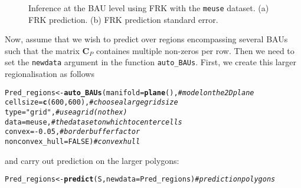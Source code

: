 \documentclass{article}\usepackage[]{graphicx}\usepackage[]{color}
\makeatletter
\newcommand{\hlnum}[1]{\textcolor[rgb]{0.686,0.059,0.569}{#1}}%
\newcommand{\hlstr}[1]{\textcolor[rgb]{0.192,0.494,0.8}{#1}}%
\newcommand{\hlcom}[1]{\textcolor[rgb]{0.678,0.584,0.686}{\textit{#1}}}%
\newcommand{\hlopt}[1]{\textcolor[rgb]{0,0,0}{#1}}%
\newcommand{\hlstd}[1]{\textcolor[rgb]{0.345,0.345,0.345}{#1}}%
\newcommand{\hlkwb}[1]{\textcolor[rgb]{0.69,0.353,0.396}{#1}}%
\newcommand{\hlkwc}[1]{\textcolor[rgb]{0.333,0.667,0.333}{#1}}%
\newcommand{\hlkwd}[1]{\textcolor[rgb]{0.737,0.353,0.396}{\textbf{#1}}}%
\newenvironment{kframe}{%
 \def\at@end@of@kframe{}%
 \ifinner\ifhmode%
  \def\at@end@of@kframe{\end{minipage}}%
  \begin{minipage}{\columnwidth}%
 \fi\fi%
 \def\FrameCommand##1{\hskip\@totalleftmargin \hskip-\fboxsep
 \colorbox{shadecolor}{##1}\hskip-\fboxsep
     \hskip-\linewidth \hskip-\@totalleftmargin \hskip\columnwidth}%
 \MakeFramed {\advance\hsize-\width
   \@totalleftmargin\z@ \linewidth\hsize
   \@setminipage}}%
 {\par\unskip\endMakeFramed%
 \at@end@of@kframe}
\newenvironment{knitrout}{}{} %
\renewcommand{\tt} {\texttt}
\newcommand{\Cmat} {\mathbf{C}}
\makeatother
\begin{document}
\begin{knitrout}
\color{fgcolor}\begin{figure}[t]
\caption{Inference at the BAU level using FRK with the \tt{meuse} dataset. (a) FRK prediction. (b) FRK prediction standard error.\label{fig:PredictionBAU}}\label{fig:unnamed-chunk-16}
\end{figure}


\end{knitrout}

Now, assume that we wish to predict over regions encompassing several BAUs such that the matrix $\Cmat_P$ containes multiple non-zeros per row. Then we need to set the \tt{newdata} argument in the function \tt{auto\_BAUs}. First, we create this larger regionalisation as follows

\begin{knitrout}
\color{fgcolor}\begin{kframe}
\begin{alltt}
\hlstd{Pred_regions} \hlkwb{<-} \hlkwd{auto_BAUs}\hlstd{(}\hlkwc{manifold} \hlstd{=} \hlkwd{plane}\hlstd{(),}      \hlcom{# model on the 2D plane}
                          \hlkwc{cellsize} \hlstd{=} \hlkwd{c}\hlstd{(}\hlnum{600}\hlstd{,}\hlnum{600}\hlstd{),}   \hlcom{# choose a large grid size}
                          \hlkwc{type} \hlstd{=} \hlstr{"grid"}\hlstd{,}           \hlcom{# use a grid (not hex)}
                          \hlkwc{data} \hlstd{= meuse,}            \hlcom{# the dataset on which to center cells}
                          \hlkwc{convex}\hlstd{=}\hlopt{-}\hlnum{0.05}\hlstd{,}            \hlcom{# border buffer factor}
                          \hlkwc{nonconvex_hull}\hlstd{=}\hlnum{FALSE}\hlstd{)}    \hlcom{# convex hull}
\end{alltt}
\end{kframe}
\end{knitrout}


\noindent and carry out prediction on the larger polygons:

\begin{knitrout}
\color{fgcolor}\begin{kframe}
\begin{alltt}
\hlstd{Pred_regions} \hlkwb{<-} \hlkwd{predict}\hlstd{(S,} \hlkwc{newdata} \hlstd{= Pred_regions)}    \hlcom{# prediction polygons}
\end{alltt}
\end{kframe}
\end{knitrout}
\end{document}
